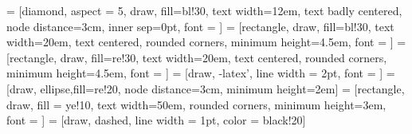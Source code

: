 \documentclass{beamer}
\begin{document}
\pagestyle{empty}





 = [diamond, aspect = 5, draw, fill=bl!30, 
    text width=12em, text badly centered, node distance=3cm, inner sep=0pt, font = \huge]
 = [rectangle, draw, fill=bl!30, 
text width=20em, text centered, rounded corners, minimum height=4.5em, font = \huge]
 = [rectangle, draw, fill=re!30, 
text width=20em, text centered, rounded corners, minimum height=4.5em, font = \huge]
 = [draw, -latex', line width = 2pt, font = \Large]
 = [draw, ellipse,fill=re!20, node distance=3cm,
minimum height=2em]
 = [rectangle, draw, fill = ye!10,
text width=50em, rounded corners, minimum height=3em, font = \ttfamily\Large]
 = [draw, dashed, line width = 1pt, color = black!20]
\end{document}
